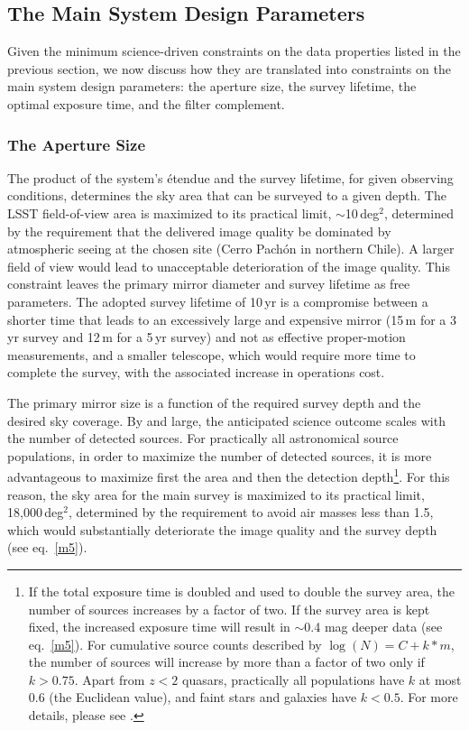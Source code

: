 \subsection{The Main System Design Parameters}

Given the minimum science-driven constraints on the data properties listed
in the previous section, we now discuss how they are translated into
constraints on the main system design parameters: the aperture size,
the survey lifetime, the optimal exposure time, and the filter complement.


\subsubsection{The Aperture Size }
\label{Sec:apSize}
The product of the system's \'etendue and the survey lifetime, for given
observing conditions, determines
the sky area that can be surveyed to a given depth.
The
LSST field-of-view area is maximized to its practical limit, $\sim$10\,deg$^2$,
determined by the requirement that the delivered image quality be dominated
by atmospheric seeing at the chosen site (Cerro Pach\'{o}n in northern Chile).
A larger field of view would lead to unacceptable deterioration of the
image quality. This constraint leaves the primary mirror diameter and survey lifetime
as free parameters. The adopted survey lifetime of 10\,yr is a compromise
between a shorter time that leads to an excessively large and expensive mirror (15\,m for a
3\,yr survey and 12\,m for a 5\,yr survey) and not as effective proper-motion
measurements, and a smaller telescope, which would require more time to complete the
survey, with the associated increase in operations cost.

The primary mirror size is a function of the required survey depth and the
desired sky coverage. By and large, the anticipated science outcome scales
with the number of detected sources. For practically all astronomical source
populations, in order to maximize the number of detected sources, it is more
advantageous to maximize first the area and then
the detection depth\footnote{
If the total exposure time is doubled and used to double the survey area,
the number of sources increases by a factor of two. If the survey
area is kept fixed, the increased exposure time will result in
$\sim$0.4 mag deeper data (see eq.~\ref{m5}). For cumulative source
counts described by $\log(N) = C + k*m$, the number of sources
will increase by more than a factor of two only if $k>0.75$.
Apart from $z<2$ quasars, practically all populations
have $k$ at most 0.6 (the Euclidean value), and faint stars
and galaxies have $k<0.5$. For more details, please see \citet{2003AJ....125.2740N}.}.
For this reason, the sky area for the main survey is
maximized to its practical limit, 18,000\,deg$^2$, determined by the
requirement to avoid air masses less than 1.5,
which would substantially
deteriorate the image quality and the survey depth (see eq.~\ref{m5}).

